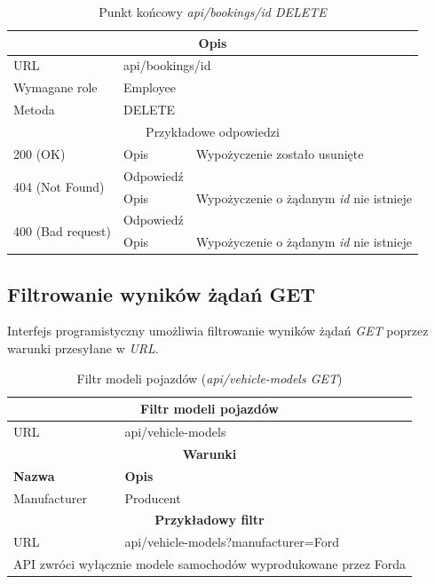 \documentclass[eng,printmode,openany]{mgr}
\begin{document}
	\begin{table}[H]
		\caption{Punkt końcowy \textit{api/bookings/id DELETE}}
		\begin{tabularx}{\textwidth}{|l|l|X|}
			\hline
			\multicolumn{3}{|c|}{Opis}                         						\\ \hline
			URL                       & \multicolumn{2}{l|}{api/bookings/id} 	\\ \hline
			Wymagane role             & \multicolumn{2}{l|}{Employee} \\ \hline
			Metoda                    & \multicolumn{2}{l|}{DELETE} 				\\ \hline
			\multicolumn{3}{|c|}{ Przykładowe odpowiedzi}                   		\\ \hline
			200 (OK)			& Opis         	& Wypożyczenie zostało usunięte	        \\ \hline
			\multirow{2}{*}{404 (Not Found)} 	& Odpowiedź     &    \\ \cline{2-3} 
			& Opis          & Wypożyczenie o żądanym \textit{id} nie istnieje  							        \\ \hline
			\multirow{2}{*}{400 (Bad request)} 	& Odpowiedź     &    \\ \cline{2-3} 
			& Opis          & Wypożyczenie o żądanym \textit{id} nie istnieje  							        \\ \hline                            
		\end{tabularx}
	\end{table}
	
	\subsection{Filtrowanie wyników żądań GET}
	Interfejs programistyczny umożliwia filtrowanie wyników żądań \textit{GET} poprzez warunki przesyłane w \textit{URL}.
	\begin{table}[H]
		\caption{Filtr modeli pojazdów (\textit{api/vehicle-models GET})}
		\begin{tabularx}{\textwidth}{|l|X|}
			\hline                                       							
			\multicolumn{2}{|c|}{\textbf{Filtr modeli pojazdów}}  							        \\ \hline
			URL                 & api/vehicle-models     							             	\\ \hline
			\multicolumn{2}{|c|}{\textbf{Warunki}}     												\\ \hline
			\textbf{Nazwa}      & \textbf{Opis}              										\\ \hline
			Manufacturer        & Producent         												\\ \hline
			\multicolumn{2}{|c|}{\textbf{Przykładowy filtr}}										\\ \hline
			URL                 & api/vehicle-models?manufacturer=Ford								\\ \hline
			\multicolumn{2}{|l|}{API zwróci wyłącznie modele samochodów wyprodukowane przez Forda}	\\ \hline
		\end{tabularx}
	\end{table}
	
\end{document}

